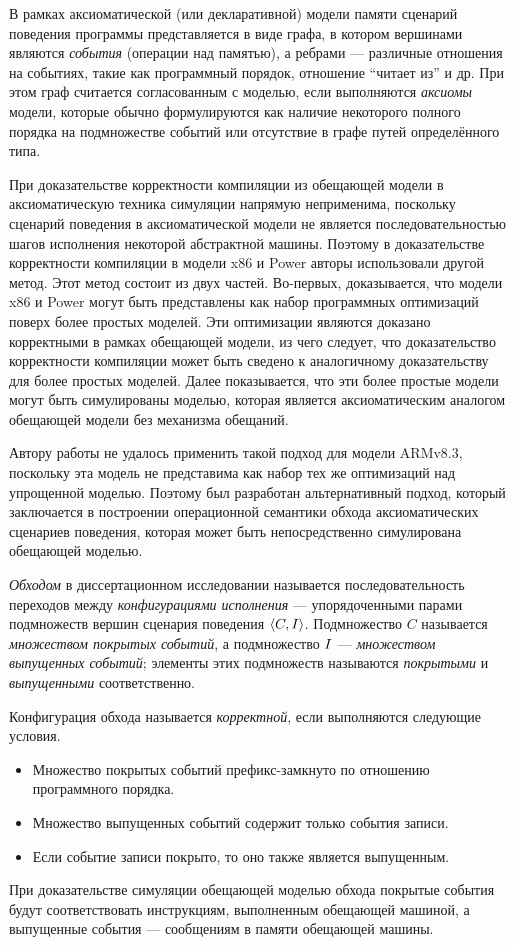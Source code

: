 В рамках аксиоматической (или декларативной) модели памяти сценарий поведения программы представляется в виде графа, в котором вершинами
являются \emph{события} (операции над памятью), а ребрами --- различные отношения на событиях, такие как программный
порядок, отношение ``читает из'' и др. При этом граф считается согласованным с моделью, если выполняются \emph{аксиомы} модели,
которые обычно формулируются как наличие некоторого полного порядка на подмножестве событий или отсутствие  в графе путей определённого
типа.

При доказательстве корректности компиляции из обещающей модели в аксиоматическую техника симуляции напрямую
неприменима, поскольку сценарий поведения в аксиоматической модели не является последовательностью шагов исполнения некоторой абстрактной машины.
Поэтому в доказательстве корректности компиляции в 
модели x86 и Power авторы использовали другой метод. Этот метод состоит из двух частей.
Во-первых, доказывается, что модели x86 и Power могут быть представлены как набор программных оптимизаций поверх
более простых моделей. Эти оптимизации являются доказано корректными в рамках обещающей модели, из чего следует,
что доказательство корректности компиляции может быть сведено к аналогичному доказательству для более простых моделей.
Далее показывается, что эти более простые модели могут быть симулированы моделью, которая является аксиоматическим аналогом
обещающей модели без механизма обещаний.

Автору работы не удалось применить такой подход для модели ARMv8.3, поскольку эта модель не представима как набор тех же
оптимизаций над упрощенной моделью. Поэтому был разработан альтернативный подход,
который заключается в построении операционной семантики обхода аксиоматических сценариев поведения, которая может быть
непосредственно симулирована обещающей моделью.

\emph{Обходом} в диссертационном исследовании называется последовательность переходов между \emph{конфигурациями исполнения} ---
упорядоченными парами подмножеств вершин сценария поведения ${\langle{C, I}\rangle}$.
Подмножество $C$ называется \emph{множеством покрытых событий}, а подмножество $I$ --- \emph{множеством выпущенных событий};
элементы этих подмножеств называются \emph{покрытыми} и \emph{выпущенными} соответственно.

Конфигурация обхода называется \emph{корректной}, если выполняются следующие условия.
\begin{itemize}
  \item Множество покрытых событий префикс-замкнуто по отношению программного порядка.
  \item Множество выпущенных событий содержит только события записи.
  \item Если событие записи покрыто, то оно также является выпущенным.
\end{itemize}
При доказательстве симуляции обещающей моделью обхода покрытые события будут соответствовать инструкциям, выполненным
обещающей машиной, а выпущенные события --- сообщениям в памяти обещающей машины.

